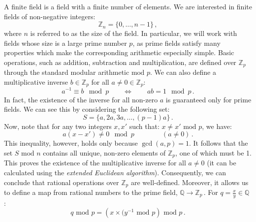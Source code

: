 \documentclass[main.tex]{subfiles}
\begin{document}
A finite field is a field with a finite number of elements. We are interested in finite fields of non-negative integers:
\begin{equation} \label{eq:ffdefinition}
    \mathbb{Z}_n = \{0, \ldots, n-1\}\,,    
\end{equation}
where $n$ is referred to as the size of the field. In particular, we will work with fields whose size is a large prime number $p$, as prime fields satisfy many properties which make the corresponding arithmetic especially simple. Basic operations, such as addition, subtraction and multiplication, are defined over $\mathbb{Z}_p$ through the standard modular arithmetic $\text{mod } p$. We can also define a multiplicative inverse $b\in \mathbb{Z}_p$ for all $a\neq0 \in \mathbb{Z}_p$:
\begin{equation}
    a^{-1} \equiv b \mod p \qquad \Longleftrightarrow \qquad ab = 1 \mod p\,.
\end{equation}
In fact, the existence of the inverse for all non-zero $a$ is guaranteed only for prime fields. We can see this by considering the following set:
\begin{equation}
    S = \{a, 2a, 3a, \ldots, (p-1)a\}\,.
\end{equation}
Now, note that for any two integers $x, x'$ such that: $x \neq x' \text{ mod } p$, we have:
\begin{equation}
    a(x-x') \neq 0 \mod p \qquad \qquad (a \neq 0) \,.
\end{equation}
This inequality, however, holds only because $\gcd(a, p) = 1$. It follows that the set $S \text{ mod } n$ contains all unique, non-zero elements of $\mathbb{Z}_p$, one of which must be 1. This proves the existence of the multiplicative inverse for all $a \neq 0$ (it can be calculated using the \textit{extended Euclidean algorithm}). Consequently, we can conclude that rational operations over $\mathbb{Z}_p$ are well-defined. Moreover, it allows us to define a map from rational numbers to the prime field, $\mathbb{Q} \rightarrow \mathbb{Z}_p\,$. For $q=\frac{x}{y} \in \mathbb{Q}\,$: 
\begin{equation}
    q \text{ mod } p = \left(x \times (y^{-1} \text{ mod } p \right) \text{ mod } p\,.
\end{equation}
\end{document}
